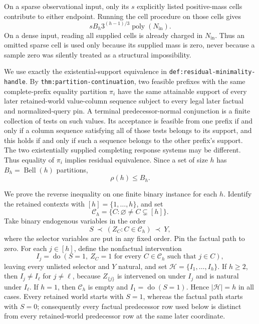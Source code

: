 On a sparse observational input, only its \(s\) explicitly listed positive-mass cells contribute to either endpoint.  Running the cell procedure on those cells gives
\[
 sB_h3^{(h-1)/3}\operatorname{poly}(N_{\mathrm{in}}).
\]
On a dense input, reading all supplied cells is already charged in \(N_{\mathrm{in}}\).  Thus an omitted sparse cell is used only because its supplied mass is zero, never because a sample zero was silently treated as a structural impossibility.

We use exactly the existential-support equivalence in \texttt{def:residual-minimality-handle}.  By \texttt{thm:partition-continuation}, two feasible prefixes with the same complete-prefix equality partition \(\pi_i\) have the same attainable support of every later retained-world value-column sequence subject to every legal later factual and normalized-query pin.  A terminal predecessor-normal conjunction is a finite collection of tests on such values.  Its acceptance is feasible from one prefix if and only if a column sequence satisfying all of those tests belongs to its support, and this holds if and only if such a sequence belongs to the other prefix's support.  The two existentially supplied completing response systems may be different.  Thus equality of \(\pi_i\) implies residual equivalence.  Since a set of size \(h\) has \(B_h=\operatorname{Bell}(h)\) partitions,
\[
 \rho(h)\leq B_h.
\tag{8}
\]

We prove the reverse inequality on one finite binary instance for each \(h\).  Identify the retained contexts with \([h]=\{1,\ldots,h\}\), and set
\[
 \mathscr C_h=\{C:\varnothing\neq C\subsetneq[h]\}.
\]
Take binary endogenous variables in the order
\[
 S\ \prec\ (Z_C:C\in\mathscr C_h)\ \prec\ Y,
\tag{9}
\]
where the selector variables are put in any fixed order.  Pin the factual path to zero.  For each \(j\in[h]\), define the nonfactual intervention
\[
 I_j=\operatorname{do}\!\left(S=1,\ Z_C=1\text{ for every }C\in\mathscr C_h\text{ such that }j\in C\right),
\tag{10}
\]
leaving every unlisted selector and \(Y\) natural, and set \(\mathcal H=\{I_1,\ldots,I_h\}\).  If \(h\geq2\), then \(I_j\neq I_\ell\) for \(j\neq\ell\), because \(Z_{\{j\}}\) is intervened on under \(I_j\) and is natural under \(I_\ell\).  If \(h=1\), then \(\mathscr C_h\) is empty and \(I_1=\operatorname{do}(S=1)\).  Hence \(|\mathcal H|=h\) in all cases.  Every retained world starts with \(S=1\), whereas the factual path starts with \(S=0\); consequently every factual predecessor row used below is distinct from every retained-world predecessor row at the same later coordinate.

